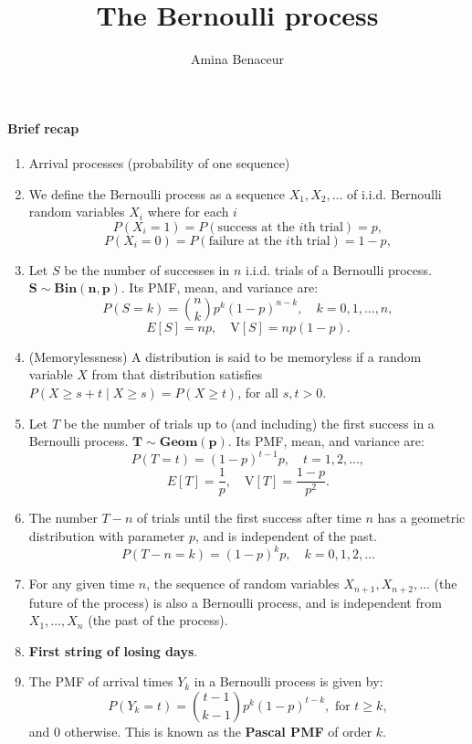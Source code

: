\documentclass[twocolumn,12pt,a4paper]{article}
\title{ \bfseries \Huge {The Bernoulli process}}
\author{Amina Benaceur}
\newcounter{num}  %
\begin{document}
	\maketitle
	\setcounter{num}{1}  %
	
	\thispagestyle{empty} 
	\paragraph{Brief recap}
	
	\begin{enumerate}
		\item Arrival processes (probability of one sequence)
		\item We define the Bernoulli process as a sequence \( X_1, X_2, \dots \) of i.i.d. Bernoulli random variables \( X_i \) where for each \( i \)
		$$
		P(X_i = 1) = P(\text{success at the } i\text{th trial}) = p,
		$$ $$
		P(X_i = 0) = P(\text{failure at the } i\text{th trial}) = 1 - p,
		$$
		
		\item  Let \( S \) be the number of successes in \( n \) i.i.d. trials of a Bernoulli process. \( \mathbf{ S \sim Bin(n,p)}\). 
		Its PMF, mean, and variance are:
		\[
		P(S=k) = \binom{n}{k} p^k (1 - p)^{n-k}, \quad k = 0, 1, \dots, n,
		\]
		\[
		E[S] = np, \quad \text{V}[S] = np(1 - p).
		\]
		
		\item (Memorylessness) A distribution is said to be memoryless if a random variable $X$ from that distribution satisfies
		$P(X \geq s + t \mid X \geq s) = P(X \geq t)$, for all $s, t > 0$.
		\item Let \( T \) be the number of trials up to (and including) the first success in a Bernoulli process. \( \mathbf{ T \sim Geom(p)}\). 
		Its PMF, mean, and variance are:
		\[
		P(T=t) = (1 - p)^{t-1} p, \quad t = 1, 2, \dots,
		\]
		\[
		E[T] = \frac{1}{p}, \quad \text{V}[T] = \frac{1 - p}{p^2}.
		\]
		\item  	The number \( T - n \) of trials until the first success after time \( n \) has a geometric distribution with parameter \( p \), and is independent of the past.
		\[
		P(T - n = k) = (1 - p)^k p, \quad k = 0, 1, 2, \dots
		\]
		\item  For any given time \( n \), the sequence of random variables \( X_{n+1}, X_{n+2}, \dots \) (the future of the process) is also a Bernoulli process, and is independent from \( X_1, \dots, X_n \) (the past of the process).
		\item \textbf{First string of losing days}.
		\item  The PMF of arrival times $Y_k$ in a Bernoulli process is given by:
		\[
		P(Y_k = t) = \binom{t-1}{k-1} p^k (1 - p)^{t-k}, \text{ for } t \geq k,
		\]
		and 0 otherwise.
		This is known as the {\bfseries Pascal PMF} of order $k$.
	\end{enumerate}
	
\end{document}
